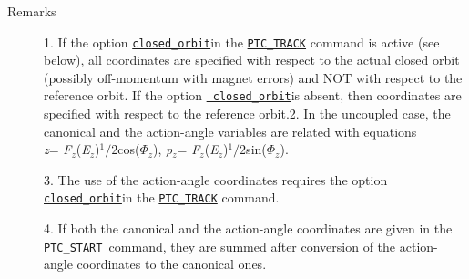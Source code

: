 \begin{description}
	\item[Remarks] 1. If the option \texttt{\hyperlink{CLOSED_ORBIT}{closed\_orbit}}in the \texttt{\hyperlink{PTC_TRACK}{PTC\_TRACK}} 
     command is active (see below), all coordinates are specified with 
     respect to the actual closed orbit (possibly off-momentum with 
     magnet errors) and NOT with respect to the reference orbit. If 
     the option \texttt{\hyperlink{CLOSED_ORBIT}{
       closed\_orbit}}is absent, then coordinates are specified with respect 
     to the reference orbit.2. In the uncoupled case, the canonical 
     and the action-angle variables are related with equations
       \textit{
\\
       z}=
     \textit{F$_z$}(\textit{E$_z$})$^1/2$cos(\textit{$\Phi$}$_\textit{z}$),
       \textit{p$_z$}= \textit{F$_z$}(\textit{E$_z$})$^1/2$sin(\textit{$\Phi$}$_\textit{z}$).

3. The use of the action-angle coordinates 
       requires the option \texttt{\hyperlink{CLOSED_ORBIT}{closed\_orbit}}in the \texttt{\hyperlink{PTC_TRACK}{PTC\_TRACK}} 
       command. 

4. If both the canonical and the action-angle coordinates are 
     given in the \texttt{PTC\_START }command, they 
     are summed after conversion of the action-angle coordinates to 
     the canonical ones.
\end{description}
